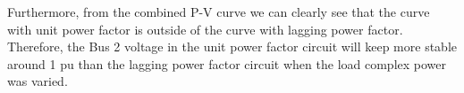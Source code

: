 \documentclass{article}
\begin{document}
Furthermore, from the combined P-V curve we can clearly see that the curve with unit power factor is outside of the curve with lagging power factor. Therefore, the Bus 2 voltage in the unit power factor circuit will keep more stable around 1 pu than the lagging power factor circuit when the load complex power was varied.

\end{document}
